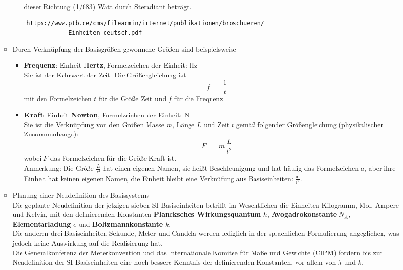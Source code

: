 \documentclass[a4paper,12pt,DIV=15]{scrartcl}
\begin{document}
\begin{enumerate}
\begin{itemize}
\begin{enumerate}[1.)]
			dieser Richtung (1/683) Watt durch Steradiant beträgt.
		\end{enumerate}
	\begin{verbatim}
	https://www.ptb.de/cms/fileadmin/internet/publikationen/broschueren/
				Einheiten_deutsch.pdf
	\end{verbatim}
	\item Durch Verknüpfung der Basisgrößen gewonnene Größen sind beispielsweise
		\begin{itemize}
		\item \textbf{Frequenz}: Einheit \textbf{Hertz}, Formelzeichen der Einheit: Hz\\
			Sie ist der Kehrwert der Zeit. Die Größengleichung ist
\begin{equation}
			f \; = \; \frac{1}{t}
\end{equation}
			mit den Formelzeichen $t$ für die Größe Zeit und $f$ für die Frequenz
		\item \textbf{Kraft}: Einheit \textbf{Newton}, Formelzeichen der Einheit: N\\
			Sie ist die Verknüpfung von den Größen Masse $m$, Länge $L$ und Zeit $t$
			gemäß folgender Größengleichung (physikalischen Zusammenhangs):
\begin{equation}
			F \; = \; m \, \frac{L}{t^2}
\end{equation}
			wobei $F$ das Formelzeichen für die Größe Kraft ist.\\
			Anmerkung: Die Größe $\frac{L}{t^2}$ hat einen eigenen Namen, sie heißt
			Beschleunigung und hat häufig das Formelzeichen $a$, aber ihre Einheit hat keinen
			eigenen Namen, die Einheit bleibt eine Verknüfung aus Basiseinheiten:
			$\frac{\mathrm{m}}{\mathrm{s}^2}$.
		\end{itemize}
		\item Planung einer Neudefinition des Basissystems\\
Die geplante Neudefinition der jetzigen sieben SI-Basiseinheiten betrifft im Wesentlichen die Einheiten Kilogramm, Mol, Ampere und Kelvin, mit den definierenden Konstanten \textbf{Plancksches Wirkungsquantum} $h$, \textbf{Avogadrokonstante} $N_A$, \textbf{Elementarladung} $e$ und \textbf{Boltzmannkonstante} $k$.\\
Die anderen drei Basiseinheiten Sekunde, Meter und Candela werden lediglich in der sprachlichen Formulierung angeglichen, was jedoch keine Auswirkung auf die Realisierung hat.\\
Die Generalkonferenz der Meterkonvention und das Internationale Komitee für Maße und Gewichte (CIPM) fordern bis zur Neudefinition der SI-Basiseinheiten eine noch bessere Kenntnis der definierenden Konstanten, vor allem von $h$ und $k$.

\end{itemize}
\end{enumerate}
\end{document}
